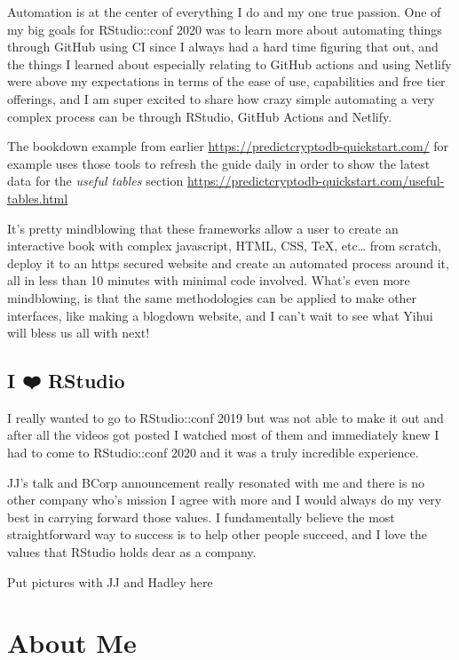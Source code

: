 \documentclass[
]{book}
\begin{document}
Automation is at the center of everything I do and my one true passion. One of my big goals for RStudio::conf 2020 was to learn more about automating things through GitHub using CI since I always had a hard time figuring that out, and the things I learned about especially relating to GitHub actions and using Netlify were above my expectations in terms of the ease of use, capabilities and free tier offerings, and I am super excited to share how crazy simple automating a very complex process can be through RStudio, GitHub Actions and Netlify.

The bookdown example from earlier \url{https://predictcryptodb-quickstart.com/} for example uses those tools to refresh the guide daily in order to show the latest data for the \emph{useful tables} section \url{https://predictcryptodb-quickstart.com/useful-tables.html}

It's pretty mindblowing that these frameworks allow a user to create an interactive book with complex javascript, HTML, CSS, TeX, etc\ldots{} from scratch, deploy it to an https secured website and create an automated process around it, all in less than 10 minutes with minimal code involved. What's even more mindblowing, is that the same methodologies can be applied to make other interfaces, like making a blogdown website, and I can't wait to see what Yihui will bless us all with next!

\hypertarget{rstudio}{%
\section{I ❤️ RStudio}\label{rstudio}}

I really wanted to go to RStudio::conf 2019 but was not able to make it out and after all the videos got posted I watched most of them and immediately knew I had to come to RStudio::conf 2020 and it was a truly incredible experience.

JJ's talk and BCorp announcement really resonated with me and there is no other company who's mission I agree with more and I would always do my very best in carrying forward those values. I fundamentally believe the most straightforward way to success is to help other people succeed, and I love the values that RStudio holds dear as a company.

Put pictures with JJ and Hadley here

\hypertarget{about-me}{%
\chapter{About Me}\label{about-me}}
\end{document}
